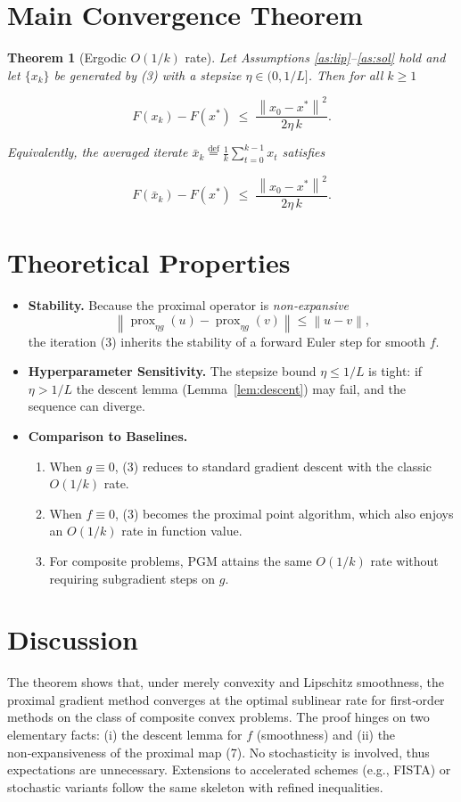 \documentclass{article}
\newtheorem{theorem}{Theorem}
\newcommand{\prox}{\operatorname{prox}}
\newcommand{\norm}[1]{\left\lVert #1\right\rVert}
\begin{document}
\section*{Main Convergence Theorem}
\begin{theorem}[Ergodic $O(1/k)$ rate]\label{thm:ergodic}
Let Assumptions \ref{as:lip}–\ref{as:sol} hold and let $\{x_{k}\}$ be generated by (3) with a stepsize $\eta\in(0,1/L]$. Then for all $k\ge1$  

\[
F(x_{k})-F(x^{*})\;\le\;\frac{\norm{x_{0}-x^{*}}^{2}}{2\eta\,k}.
\tag{5}
\]

Equivalently, the averaged iterate $\bar x_{k}\stackrel{\text{def}}{=}\frac1k\sum_{t=0}^{k-1}x_{t}$ satisfies  

\[
F(\bar x_{k})-F(x^{*})\;\le\;\frac{\norm{x_{0}-x^{*}}^{2}}{2\eta\,k}.
\tag{6}
\]
\end{theorem}

\section*{Theoretical Properties}
\begin{itemize}
\item \textbf{Stability.}  Because the proximal operator is \emph{non‑expansive}
\[
\norm{\prox_{\eta g}(u)-\prox_{\eta g}(v)}\le \norm{u-v},
\tag{7}
\]
the iteration (3) inherits the stability of a forward Euler step for smooth $f$.
\item \textbf{Hyperparameter Sensitivity.}  The stepsize bound $\eta\le1/L$ is tight: if $\eta>1/L$ the descent lemma (Lemma~\ref{lem:descent}) may fail, and the sequence can diverge.
\item \textbf{Comparison to Baselines.}
    \begin{enumerate}
        \item When $g\equiv0$, (3) reduces to standard gradient descent with the classic $O(1/k)$ rate.
        \item When $f\equiv0$, (3) becomes the proximal point algorithm, which also enjoys an $O(1/k)$ rate in function value.
        \item For composite problems, PGM attains the same $O(1/k)$ rate without requiring subgradient steps on $g$.
    \end{enumerate}
\end{itemize}

\section*{Discussion}
The theorem shows that, under merely convexity and Lipschitz smoothness, the proximal gradient method converges at the optimal sublinear rate for first‑order methods on the class of composite convex problems.  The proof hinges on two elementary facts: (i) the descent lemma for $f$ (smoothness) and (ii) the non‑expansiveness of the proximal map (7).  No stochasticity is involved, thus expectations are unnecessary.  Extensions to accelerated schemes (e.g., FISTA) or stochastic variants follow the same skeleton with refined inequalities.
\end{document}
